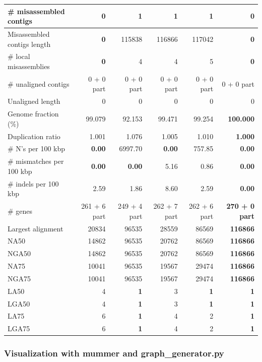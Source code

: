 \documentclass[12pt]{article}
\begin{document}
\begin{table}[h!]
\begin{center}
{\begin{tabular}{|l*{5}{|r}|}
\# misassembled contigs & {\bf 0} & 1 & 1 & 1 & {\bf 0} \\ \hline
Misassembled contigs length & {\bf 0} & 115838 & 116866 & 117042 & {\bf 0} \\ \hline
\# local misassemblies & {\bf 0} & 4 & 4 & 5 & {\bf 0} \\ \hline
\# unaligned contigs & 0 + 0 part & 0 + 0 part & 0 + 0 part & 0 + 0 part & 0 + 0 part \\ \hline
Unaligned length & 0 & 0 & 0 & 0 & 0 \\ \hline
Genome fraction (\%) & 99.079 & 92.153 & 99.471 & 99.254 & {\bf 100.000} \\ \hline
Duplication ratio & 1.001 & 1.076 & 1.005 & 1.010 & {\bf 1.000} \\ \hline
\# N's per 100 kbp & {\bf 0.00} & 6997.70 & {\bf 0.00} & 757.85 & {\bf 0.00} \\ \hline
\# mismatches per 100 kbp & {\bf 0.00} & {\bf 0.00} & 5.16 & 0.86 & {\bf 0.00} \\ \hline
\# indels per 100 kbp & 2.59 & 1.86 & 8.60 & 2.59 & {\bf 0.00} \\ \hline
\# genes & 261 + 6 part & 249 + 4 part & 262 + 7 part & 262 + 6 part & {\bf 270 + 0 part} \\ \hline
Largest alignment & 20834 & 96535 & 28559 & 86569 & {\bf 116866} \\ \hline
NA50 & 14862 & 96535 & 20762 & 86569 & {\bf 116866} \\ \hline
NGA50 & 14862 & 96535 & 20762 & 86569 & {\bf 116866} \\ \hline
NA75 & 10041 & 96535 & 19567 & 29474 & {\bf 116866} \\ \hline
NGA75 & 10041 & 96535 & 19567 & 29474 & {\bf 116866} \\ \hline
LA50 & 4 & {\bf 1} & 3 & {\bf 1} & {\bf 1} \\ \hline
LGA50 & 4 & {\bf 1} & 3 & {\bf 1} & {\bf 1} \\ \hline
LA75 & 6 & {\bf 1} & 4 & 2 & {\bf 1} \\ \hline
LGA75 & 6 & {\bf 1} & 4 & 2 & {\bf 1} \\ \hline
\end{tabular}
}
\end{center}
\end{table}
\newpage

\subsubsection{Visualization with mummer and graph\_generator.py}
\end{document}

